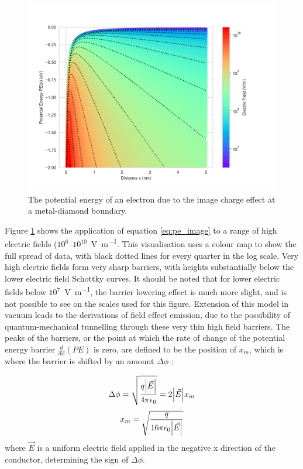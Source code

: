 \begin{refsection}
\begin{figure}[H]
    \centering
    \includegraphics[width=\textwidth]{Chapter2/Figs/Raster/PE_image_charge_diamond.png}
    \caption{The potential energy of an electron due to the image charge effect at a metal-diamond boundary.}
    \label{fig:pe_image_charge}
\end{figure}

Figure \ref{fig:pe_image_charge} shows the application of equation \ref{eq:pe_image} to a range of high electric fields ($10^{6}$--$10^{10}$~\si{\volt\per\metre}. This visualisation uses a colour map to show the full spread of data, with black dotted lines for every quarter in the log scale. Very high electric fields form very sharp barriers, with heights substantially below the lower electric field Schottky curves. It should be noted that for lower electric fields below $10^{7}$~\si{\volt\per\metre}, the barrier lowering effect is much more slight, and is not possible to see on the scales used for this figure. Extension of this model in vacuum leads to the derivations of field effect emission, due to the possibility of quantum-mechanical tunnelling through these very thin high field barriers. The peaks of the barriers, or the point at which the rate of change of the potential energy barrier $\frac{d}{dx}(PE)$ is zero, are defined to be the position of $x_{m}$, which is where the barrier is shifted by an amount $\Delta\phi$ \cite{deVisschere1986, sze2006}:

\begin{equation}
\label{eq:image_force_barrier_lowering}
    \Delta \phi = \sqrt{\frac{q\abs{\vec{E}}}{4\pi\epsilon_{0}}} = 2\abs{\vec{E}}x_{m}
\end{equation}
\begin{equation}
    x_{m}= \sqrt{\frac{q}{16\pi\epsilon_{0}\abs{\Vec{E}}}}
\end{equation}
where $\vec{E}$ is a uniform electric field applied in the negative x direction of the conductor, determining the sign of $\Delta\phi$. 


\end{refsection}
